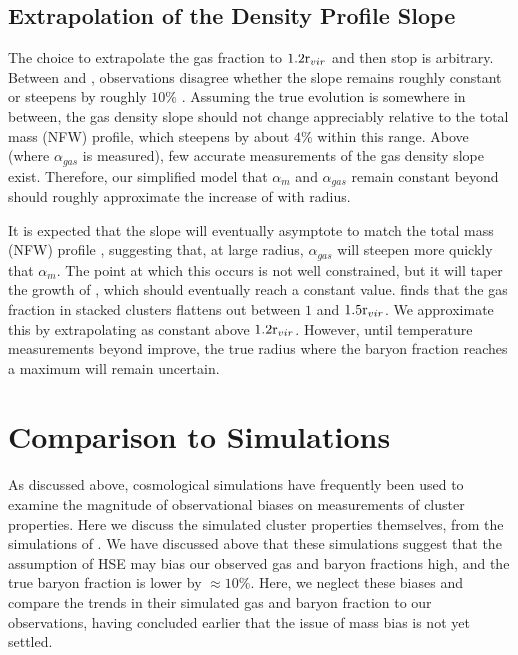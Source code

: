 \subsection{Extrapolation of the Density Profile Slope}
\label{sec:Limitations.Slope}
The choice to extrapolate the gas fraction to $1.2\textrm{r\ensuremath{_{vir}}}{}$ and then
stop is arbitrary. Between \rfive{} and \rtwo{}, observations disagree
whether the slope remains roughly constant \citep{Dai2010} or steepens
by roughly $10\%$ \citep{Ettori2009a}. Assuming the true evolution is
somewhere in between, the gas density slope should not change
appreciably relative to the total mass (NFW) profile, which steepens
by about $4\%$ within this range. Above \rtwo{} (where
$\alpha{}_{gas}$ is measured), few accurate measurements of the gas
density slope exist. Therefore, our simplified model that
$\alpha{}_{m}$ and $\alpha_{gas}$ remain constant beyond \rtwo{}
should roughly approximate the increase of \fg{} with radius.

It is expected that the slope will eventually asymptote to match the
total mass (NFW) profile \citep{Umetsu2009, Battaglia2013}, suggesting
that, at large radius, $\alpha_{gas}$ will steepen more quickly that
$\alpha_{m}$. The point at which this occurs is not well constrained,
but it will taper the growth of \fg{}, which should eventually reach a
constant value. \citet{PlanckIntV} finds that the gas fraction in
stacked \Planck{} clusters flattens out between $1$ and
$1.5\textrm{r\ensuremath{_{vir}}}{}$. We approximate this by extrapolating \fg{} as constant
above $1.2\textrm{r\ensuremath{_{vir}}}{}$. However, until temperature measurements beyond
\rfive{} improve, the true radius where the baryon fraction reaches a
maximum will remain uncertain.

\section{Comparison to Simulations}
\label{sec:Simulations}

As discussed above, cosmological simulations have frequently been used
to examine the magnitude of observational biases on measurements of
cluster properties. Here we discuss the simulated cluster properties
themselves, from the simulations of \textbf{\citet{Battaglia2013}}. We
have discussed above that these simulations suggest that the
assumption of HSE may bias our observed gas and baryon fractions high,
and the true baryon fraction is lower by $\approx10\%$. Here, we
neglect these biases and compare the trends in their simulated gas and
baryon fraction to our observations, having concluded earlier that the
issue of mass bias is not yet settled.

